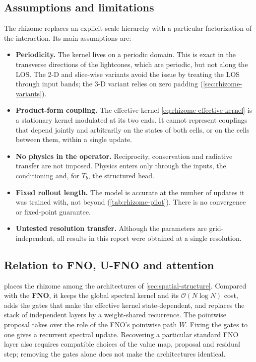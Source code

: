 \subsection{Assumptions and limitations}
\label{sec:rhizome-assumptions}

The rhizome replaces an explicit scale hierarchy with a particular factorization of the interaction. Its main assumptions are:
\begin{itemize}
  \item \textbf{Periodicity.} The kernel lives on a periodic domain. This is exact in the transverse directions of the lightcones, which are periodic, but not along the LOS. The 2-D and slice-wise variants avoid the issue by treating the LOS through input bands; the 3-D variant relies on zero padding (\cref{sec:rhizome-variants}).
  \item \textbf{Product-form coupling.} The effective kernel \cref{eq:rhizome-effective-kernel} is a stationary kernel modulated at its two ends. It cannot represent couplings that depend jointly and arbitrarily on the states of both cells, or on the cells between them, within a single update.
  \item \textbf{No physics in the operator.} Reciprocity, conservation and radiative transfer are not imposed. Physics enters only through the inputs, the conditioning and, for $T_b$, the structured head.
  \item \textbf{Fixed rollout length.} The model is accurate at the number of updates it was trained with, not beyond (\cref{tab:rhizome-pilot}). There is no convergence or fixed-point guarantee.
  \item \textbf{Untested resolution transfer.} Although the parameters are grid-independent, all results in this report were obtained at a single resolution.
\end{itemize}

\subsection{Relation to FNO, U-FNO and attention}
\label{sec:rhizome-relations}

 places the rhizome among the architectures of \cref{sec:spatial-structure}. Compared with the \textbf{FNO}, it keeps the global spectral kernel and its $\mathcal{O}(N\log N)$ cost, adds the gates that make the effective kernel state-dependent, and replaces the stack of independent layers by a weight-shared recurrence. The pointwise proposal takes over the role of the FNO's pointwise path $W$. Fixing the gates to one gives a recurrent spectral update. Recovering a particular standard FNO layer also requires compatible choices of the value map, proposal and residual step; removing the gates alone does not make the architectures identical.

